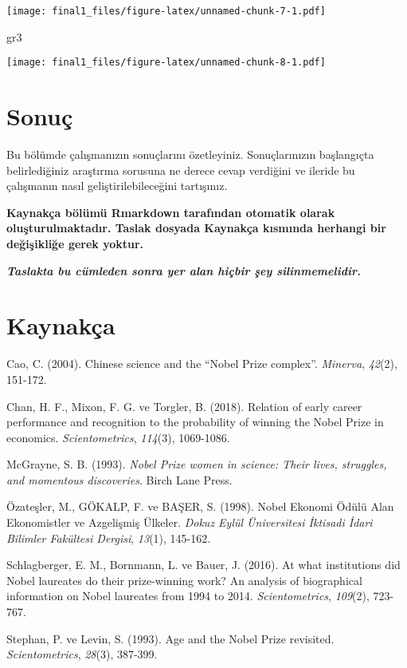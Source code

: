 \documentclass[
  12pt,
]{article}
\newenvironment{Shaded}{\begin{snugshade}}{\end{snugshade}}
\newcommand{\NormalTok}[1]{#1}
\begin{document}
\texttt{[image: final1\_files/figure-latex/unnamed-chunk-7-1.pdf]}

\begin{Shaded}
\begin{Highlighting}[]
\NormalTok{gr3}
\end{Highlighting}
\end{Shaded}

\texttt{[image: final1\_files/figure-latex/unnamed-chunk-8-1.pdf]}

\hypertarget{sonuuxe7}{%
\section{Sonuç}\label{sonuuxe7}}

Bu bölümde çalışmanızın sonuçlarını özetleyiniz. Sonuçlarınızın başlangıçta belirlediğiniz araştırma sorusuna ne derece cevap verdiğini ve ileride bu çalışmanın nasıl geliştirilebileceğini tartışınız.

\textbf{Kaynakça bölümü Rmarkdown tarafından otomatik olarak oluşturulmaktadır. Taslak dosyada Kaynakça kısmında herhangi bir değişikliğe gerek yoktur.}

\textbf{\emph{Taslakta bu cümleden sonra yer alan hiçbir şey silinmemelidir.}}

\newpage

\hypertarget{references}{%
\section{Kaynakça}\label{references}}

\hypertarget{refs}{}
\leavevmode\hypertarget{ref-cao2004chinese}{}%
Cao, C. (2004). Chinese science and the ``Nobel Prize complex''. \emph{Minerva}, \emph{42}(2), 151-172.

\leavevmode\hypertarget{ref-chan2018relation}{}%
Chan, H. F., Mixon, F. G. ve Torgler, B. (2018). Relation of early career performance and recognition to the probability of winning the Nobel Prize in economics. \emph{Scientometrics}, \emph{114}(3), 1069-1086.

\leavevmode\hypertarget{ref-mcgrayne1993nobel}{}%
McGrayne, S. B. (1993). \emph{Nobel Prize women in science: Their lives, struggles, and momentous discoveries}. Birch Lane Press.

\leavevmode\hypertarget{ref-ozatecsler1998nobel}{}%
Özateşler, M., GÖKALP, F. ve BAŞER, S. (1998). Nobel Ekonomi Ödülü Alan Ekonomistler ve Azgelişmiş Ülkeler. \emph{Dokuz Eylül Üniversitesi İktisadi İdari Bilimler Fakültesi Dergisi}, \emph{13}(1), 145-162.

\leavevmode\hypertarget{ref-schlagberger2016institutions}{}%
Schlagberger, E. M., Bornmann, L. ve Bauer, J. (2016). At what institutions did Nobel laureates do their prize-winning work? An analysis of biographical information on Nobel laureates from 1994 to 2014. \emph{Scientometrics}, \emph{109}(2), 723-767.

\leavevmode\hypertarget{ref-stephan1993age}{}%
Stephan, P. ve Levin, S. (1993). Age and the Nobel Prize revisited. \emph{Scientometrics}, \emph{28}(3), 387-399.
\end{document}
